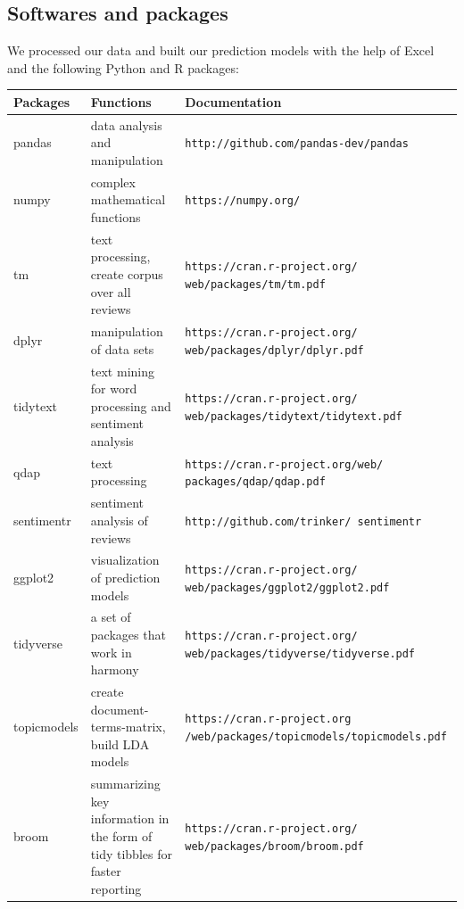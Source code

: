 \documentclass[reqno]{article}
\theoremstyle{definition}
\theoremstyle{definition}
\theoremstyle{remark}
\begin{document}
\subsection{Softwares and packages}
We processed our data and built our prediction models with the help of Excel and the following Python and R packages:
\begin{center}
\begin{tabular}{|p{2cm}|p{5cm}|p{8cm}|} 
 \hline
Packages & Functions & Documentation \\
 \hline
 pandas & data analysis and manipulation & \texttt{http://github.com/pandas-dev/pandas} \\
 \hline
 numpy &complex mathematical functions &  \texttt{https://numpy.org/}\\
 \hline
tm  & text processing, create corpus over all reviews  & \texttt{https://cran.r-project.org/ web/packages/tm/tm.pdf}\\
\hline
dplyr & manipulation of data sets & \texttt{https://cran.r-project.org/ web/packages/dplyr/dplyr.pdf}\\
 \hline
tidytext  &  text mining for word processing and sentiment analysis& \texttt{https://cran.r-project.org/ web/packages/tidytext/tidytext.pdf}\\
\hline
qdap & text processing & \texttt{https://cran.r-project.org/web/ packages/qdap/qdap.pdf}\\
\hline
sentimentr  & sentiment analysis of reviews  &
\texttt{http://github.com/trinker/ sentimentr}\\
\hline
ggplot2 & visualization of prediction models & \texttt {https://cran.r-project.org/ web/packages/ggplot2/ggplot2.pdf}\\
\hline
tidyverse  & a set of packages that work in harmony  & \texttt{https://cran.r-project.org/ web/packages/tidyverse/tidyverse.pdf}\\
\hline
topicmodels & create document-terms-matrix, build LDA models  & \texttt{https://cran.r-project.org /web/packages/topicmodels/topicmodels.pdf}\\
\hline
broom & summarizing key information in the form of tidy tibbles for faster reporting & \texttt{https://cran.r-project.org/ web/packages/broom/broom.pdf}\\
 \hline
\end{tabular}
\end{center}
\end{document}
